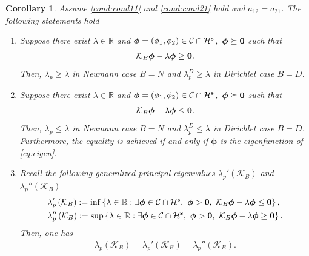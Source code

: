 \documentclass[a4paper,11pt]{amsart}
\newtheorem{corollary}[theorem]{Corollary}
\theoremstyle{definition}
\def\R{\mathbb{R}}
\numberwithin{equation}{section}
\theoremstyle{definition}
\begin{document}
\begin{corollary}
Assume \ref{cond:cond11} and \ref{cond:cond21} hold and $a_{12}=a_{21}$. The following statements hold
\begin{enumerate}[label=(\roman*)]
\item\label{ismaller}  Suppose there exist $\lambda\in\R$ and $\boldsymbol{\phi}=(\phi_1,\phi_2)\in \mathcal{C}\cap \mathcal{H}^{\bf s}$,~$\boldsymbol{\phi}\succeq {\bf 0}$ such that
\begin{align*}
\mathcal{K}_B{\bf \boldsymbol{\phi}}-\lambda\boldsymbol{\phi} \geq  {\bf 0}.
\end{align*}
Then, $\lambda_p\geq \lambda$ in Neumann case $B=N$ and $\lambda_p^D\geq \lambda$ in Dirichlet case $B=D$. 

\item\label{ibigger}  Suppose there exist $\lambda\in\R$ and $\boldsymbol{\phi}=(\phi_1,\phi_2)\in \mathcal{C}\cap \mathcal{H}^{\bf s}$,~$\boldsymbol{\phi}\succeq {\bf 0}$ such that
\begin{align*}
\mathcal{K}_B{\bf \boldsymbol{\phi}}-\lambda\boldsymbol{\phi} \leq  {\bf 0}.
\end{align*}
Then, $\lambda_p\leq \lambda$ in Neumann case $B=N$ and $\lambda_p^D\leq \lambda$ in Dirichlet case $B=D$. Furthermore, the equality is achieved if and only if $\boldsymbol{\phi}$ is the eigenfunction of \eqref{eq:eigen}.

\item\label{generalized} Recall the following generalized principal eigenvalues $\lambda_p'\left(\mathcal{K}_B\right)$ and $\lambda_p''\left(\mathcal{K}_B\right)$
\begin{align*}
&\lambda_p'\left(\mathcal{K}_B\right) := \inf\left\{\lambda\in \R:\exists \boldsymbol{\phi}\in \mathcal{C}\cap \mathcal{H}^{\bf s},~\boldsymbol{\phi}>{\bf 0},~\mathcal{K}_B{\bf \boldsymbol{\phi}}-\lambda\boldsymbol{\phi} \leq  {\bf 0} \right\},\\
&\lambda_p''\left(\mathcal{K}_B\right) := \sup\left\{\lambda\in \R:\exists \boldsymbol{\phi}\in \mathcal{C}\cap \mathcal{H}^{\bf s},~\boldsymbol{\phi}>{\bf 0},~\mathcal{K}_B {\bf \boldsymbol{\phi}}-\lambda\boldsymbol{\phi} \geq  {\bf 0} \right\}.
\end{align*}
Then, one has 
\begin{align*}
\lambda_p\left(\mathcal{K}_B\right)=\lambda_p'\left(\mathcal{K}_B\right)=\lambda_p''\left(\mathcal{K}_B\right).
\end{align*}



\end{enumerate}
\end{corollary}
\end{document}
